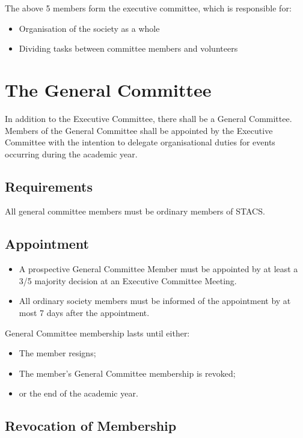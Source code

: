 \documentclass{article}
\begin{document}
The above 5 members form the executive committee, which is responsible for:

\begin{itemize}
    \item Organisation of the society as a whole
    \item Dividing tasks between committee members and volunteers
\end{itemize}

\section{The General Committee}

In addition to the Executive Committee, there shall be a General Committee. Members of the General Committee shall be appointed by the Executive Committee with the intention to delegate organisational duties for events occurring during the academic year.

\subsection{Requirements}

All general committee members must be ordinary members of STACS.

\subsection{Appointment}

\begin{itemize}
    \item A prospective General Committee Member must be appointed by at least a 3/5 majority decision at an Executive Committee Meeting.
    \item All ordinary society members must be informed of the appointment by at most 7 days after the appointment.
\end{itemize}

General Committee membership lasts until either:

\begin{itemize}
    \item The member resigns;
    \item The member’s General Committee membership is revoked;
    \item or the end of the academic year.
\end{itemize}

\subsection{Revocation of Membership}
\end{document}
